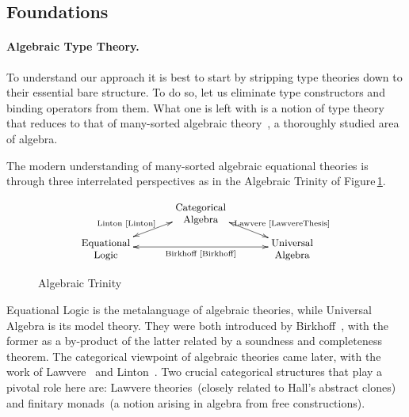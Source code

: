 \documentclass[11pt,twocolumn]{article}
\begin{document}
\subsection{Foundations}
\label{Foundations}

\setcounter{paragraph}{0}
\paragraph{Algebraic Type Theory.}
\label{AlgebraicTypeTheoryParagraph}

To understand our approach it is best to start by stripping type theories
down to their essential bare structure.  To do so, let us eliminate type
constructors and binding operators from them.  What one is left with is a
notion of type theory that reduces to that of many-sorted algebraic
theory~\cite{Birkhoff}, a thoroughly studied area of algebra.

The modern understanding of many-sorted algebraic equational theories is
through three interrelated perspectives as in the Algebraic Trinity 
of Figure\,\ref{AlgebraicTrinity}.
\begin{figure}[h]
  \caption{Algebraic Trinity}
  \vspace*{-2.5mm}
    \[\xymatrix@R=7.5pt@C=35pt{
      & \txt{\small Categorical\\ \small Algebra} 
      \ar@{<->}[dr]^(.55){\null\hspace*{5mm}\txt{\scriptsize Lawvere~\cite{LawvereThesis}}}
      \ar@{<->}[dl]_(.55){\null\hspace*{-10mm}\txt{\scriptsize Linton~\cite{Linton}}}
      & 
      \\
      \txt{\small Equational\\ \small Logic}
      \ar@{<->}[rr]_-{\txt{\scriptsize Birkhoff~\cite{Birkhoff}}}
      &
      & 
      \txt{\small Universal\\ \small Algebra} 
    }\]
  \vspace*{-2.5mm}
\label{AlgebraicTrinity}
\end{figure}
Equational Logic is the metalanguage of algebraic theories, while
Universal Algebra is its model theory.  They were both introduced by
Birkhoff~\cite{Birkhoff}, with the former as a by-product of the latter
related by a soundness and completeness theorem.  The categorical
viewpoint of algebraic theories came later, with the work of
Lawvere~\cite{LawvereThesis} and Linton~\cite{Linton}.  Two crucial
categorical structures that play a pivotal role here are: Lawvere
theories~(closely related to Hall's abstract clones) and finitary
monads~(a notion 
arising in algebra from free constructions).
\end{document}
